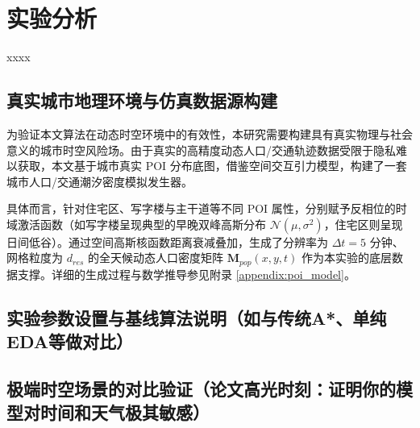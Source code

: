 
\section{实验分析}
\label{sec:case_study}

xxxx

\subsection{真实城市地理环境与仿真数据源构建}

为验证本文算法在动态时空环境中的有效性，本研究需要构建具有真实物理与社会意义的城市时空风险场。由于真实的高精度动态人口/交通轨迹数据受限于隐私难以获取，本文基于城市真实 POI 分布底图，借鉴空间交互引力模型，构建了一套城市人口/交通潮汐密度模拟发生器。

具体而言，针对住宅区、写字楼与主干道等不同 POI 属性，分别赋予反相位的时域激活函数（如写字楼呈现典型的早晚双峰高斯分布 $\mathcal{N}(\mu, \sigma^2)$，住宅区则呈现日间低谷）。通过空间高斯核函数距离衰减叠加，生成了分辨率为 $\Delta t = 5$ 分钟、网格粒度为 $d_{res}$ 的全天候动态人口密度矩阵 $\mathbf{M}_{pop}(x,y,t)$ 作为本实验的底层数据支撑。详细的生成过程与数学推导参见附录 \ref{appendix:poi_model}。

\subsection{实验参数设置与基线算法说明（如与传统A*、单纯EDA等做对比）}



\subsection{极端时空场景的对比验证（论文高光时刻：证明你的模型对时间和天气极其敏感）}